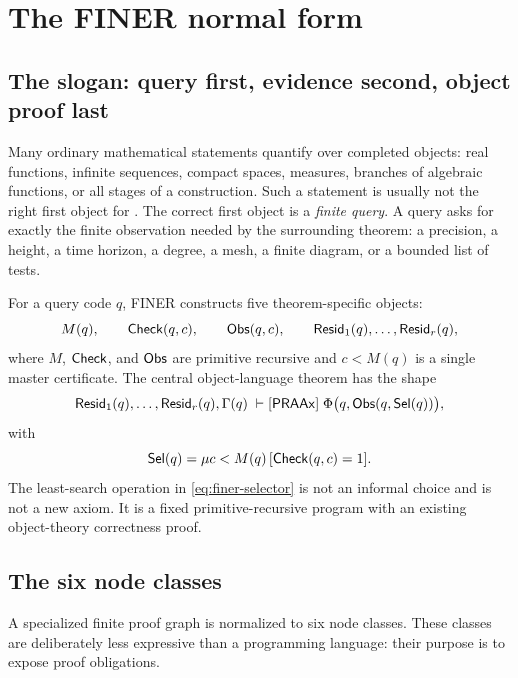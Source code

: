 \section{The FINER normal form}
\label{sec:design}

\subsection{The slogan: query first, evidence second, object proof last}

Many ordinary mathematical statements quantify over completed objects: real functions, infinite sequences, compact spaces, measures, branches of algebraic functions, or all stages of a construction.  Such a statement is usually not the right first object for \iPRA.  The correct first object is a \emph{finite query}.  A query asks for exactly the finite observation needed by the surrounding theorem: a precision, a height, a time horizon, a degree, a mesh, a finite diagram, or a bounded list of tests.

For a query code \(q\), FINER constructs five theorem-specific objects:
\begin{equation}
  M(q),\qquad \mathsf{Check}(q,c),\qquad \mathsf{Obs}(q,c),\qquad
  \mathsf{Resid}_1(q),\ldots,\mathsf{Resid}_r(q),
  \label{eq:finer-data}
\end{equation}
where \(M\), \(\mathsf{Check}\), and \(\mathsf{Obs}\) are primitive recursive and \(c<M(q)\) is a single master certificate.  The central object-language theorem has the shape
\begin{equation}
 \mathsf{Resid}_1(q),\ldots,\mathsf{Resid}_r(q),\Gamma(q)
 \;\vdash[\mathsf{PRAAx}]\;
 \Phi\bigl(q,\mathsf{Obs}(q,\mathsf{Sel}(q))\bigr),
 \label{eq:finer-endpoint}
\end{equation}
with
\begin{equation}
 \mathsf{Sel}(q)=\mu c<M(q)\,[\mathsf{Check}(q,c)=1].
 \label{eq:finer-selector}
\end{equation}
The least-search operation in \eqref{eq:finer-selector} is not an informal choice and is not a new axiom.  It is a fixed primitive-recursive program with an existing object-theory correctness proof.

\subsection{The six node classes}

A specialized finite proof graph is normalized to six node classes.  These classes are deliberately less expressive than a programming language: their purpose is to expose proof obligations.

